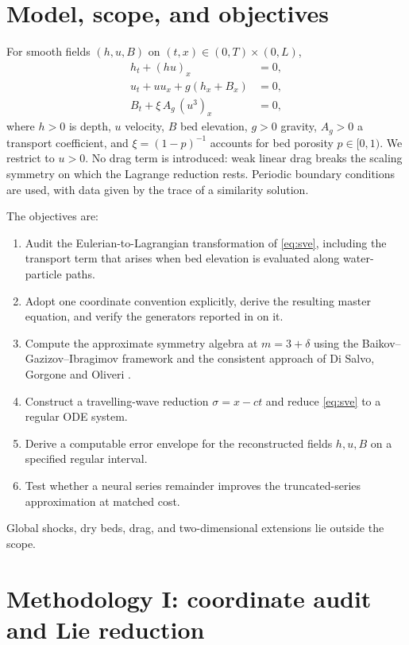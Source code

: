 \documentclass[12pt,a4paper]{article}
\begin{document}
\section{Model, scope, and objectives}
For smooth fields $(h,u,B)$ on $(t,x)\in(0,T)\times(0,L)$,
\begin{equation}
\begin{aligned}
h_t+(hu)_x&=0,\\
u_t+uu_x+g(h_x+B_x)&=0,\\
B_t+\xi\,A_g\,(u^3)_x&=0,
\end{aligned}
\label{eq:sve}
\end{equation}
where $h>0$ is depth, $u$ velocity, $B$ bed elevation, $g>0$ gravity, $A_g>0$ a transport coefficient, and $\xi=(1-p)^{-1}$ accounts for bed porosity $p\in[0,1)$. We restrict to $u>0$. No drag term is introduced: weak linear drag breaks the scaling symmetry on which the Lagrange reduction rests. Periodic boundary conditions are used, with data given by the trace of a similarity solution.

The objectives are:
\begin{enumerate}
\item Audit the Eulerian-to-Lagrangian transformation of \eqref{eq:sve}, including the transport term that arises when bed elevation is evaluated along water-particle paths.
\item Adopt one coordinate convention explicitly, derive the resulting master equation, and verify the generators reported in \cite{sve} on it.
\item Compute the approximate symmetry algebra at $m=3+\delta$ using the Baikov--Gazizov--Ibragimov framework \cite{bgi} and the consistent approach of Di Salvo, Gorgone and Oliveri \cite{disalvo}.
\item Construct a travelling-wave reduction $\sigma=x-ct$ and reduce \eqref{eq:sve} to a regular ODE system.
\item Derive a computable error envelope for the reconstructed fields $h,u,B$ on a specified regular interval.
\item Test whether a neural series remainder improves the truncated-series approximation at matched cost.
\end{enumerate}
Global shocks, dry beds, drag, and two-dimensional extensions lie outside the scope.

\section{Methodology I: coordinate audit and Lie reduction}
\end{document}
